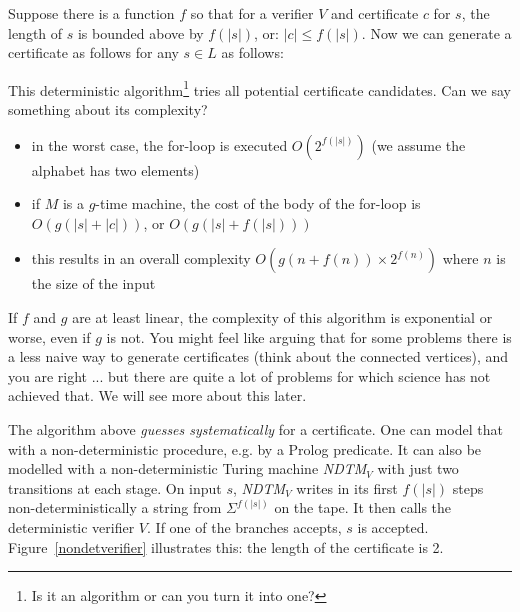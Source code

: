 Suppose there is a function $f$ so that for a verifier $V$ and
certificate $c$ for $s$, the length of $s$ is bounded above by
$f(|s|)$, or:
%
$|c| \leq f(|s|)$. Now we can generate a certificate as follows for
any $s \in L$ as follows:

\begin{algorithmic}
         \EndIf
    \EndFor
\end{algorithmic}

This deterministic algorithm\footnote{Is it an algorithm or can you
turn it into one?} tries all potential certificate candidates. Can we
say something about its complexity?


\begin{itemize}
\item
in the worst case, the for-loop is executed $O(2^{f(|s|)})$ (we assume
the alphabet has two elements)
\item 
if $M$ is a $g$-time machine, the cost of the body of the for-loop is
$O(g(|s|+|c|))$, or $O(g(|s|+f(|s|)))$
\item
this results in an overall complexity $O(g(n+f(n))\times 2^{f(n)})$
where $n$ is the size of the input
\end{itemize}

If $f$ and $g$ are at least linear, the complexity of this algorithm
is exponential or worse, even if $g$ is not. You might feel like
arguing that for some problems there is a less naive way to generate
certificates (think about the connected vertices), and you are right
... but there are quite a lot of problems for which science has not
achieved that. We will see more about this later.

The algorithm above {\em guesses systematically} for a
certificate. One can model that with a non-deterministic procedure,
e.g. by a Prolog predicate. It can also be modelled with a
non-deterministic Turing machine {\em NDTM$_V$} with just two
transitions at each stage. On input $s$, {\em NDTM$_V$} writes in its
first $f(|s|)$ steps non-deterministically a string from
$\Sigma^{f(|s|)}$ on the tape. It then calls the deterministic
verifier $V$. If one of the branches accepts, $s$ is accepted.
Figure~\ref{nondetverifier} illustrates this: the length of the
certificate is 2.


